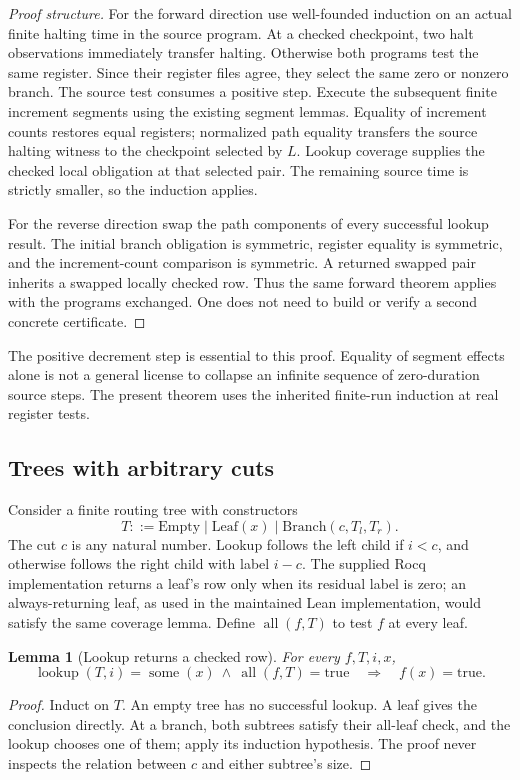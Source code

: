 \documentclass[11pt]{article}
\newtheorem{lemma}[theorem]{Lemma}
\theoremstyle{remark}\newtheorem{remark}[theorem]{Remark}
\newcommand{\get}{\operatorname{lookup}}
\newcommand{\all}{\operatorname{all}}
\newcommand{\some}{\operatorname{some}}
\begin{document}
\begin{proof}[Proof structure]
For the forward direction use well-founded induction on an actual finite halting time in the source program. At a checked checkpoint, two halt observations immediately transfer halting. Otherwise both programs test the same register. Since their register files agree, they select the same zero or nonzero branch. The source test consumes a positive step. Execute the subsequent finite increment segments using the existing segment lemmas. Equality of increment counts restores equal registers; normalized path equality transfers the source halting witness to the checkpoint selected by $L$. Lookup coverage supplies the checked local obligation at that selected pair. The remaining source time is strictly smaller, so the induction applies.

For the reverse direction swap the path components of every successful lookup result. The initial branch obligation is symmetric, register equality is symmetric, and the increment-count comparison is symmetric. A returned swapped pair inherits a swapped locally checked row. Thus the same forward theorem applies with the programs exchanged. One does not need to build or verify a second concrete certificate.
\end{proof}

The positive decrement step is essential to this proof. Equality of segment effects alone is not a general license to collapse an infinite sequence of zero-duration source steps. The present theorem uses the inherited finite-run induction at real register tests.

\subsection{Trees with arbitrary cuts}
Consider a finite routing tree with constructors
\[
 T ::= \mathrm{Empty}\mid\mathrm{Leaf}(x)\mid\mathrm{Branch}(c,T_l,T_r).
\]
The cut $c$ is any natural number. Lookup follows the left child if $i<c$, and otherwise follows the right child with label $i-c$. The supplied Rocq implementation returns a leaf's row only when its residual label is zero; an always-returning leaf, as used in the maintained Lean implementation, would satisfy the same coverage lemma. Define $\all(f,T)$ to test $f$ at every leaf.

\begin{lemma}[Lookup returns a checked row]
For every $f,T,i,x$,
\[
  \get(T,i)=\some(x)\ \wedge\ \all(f,T)=\mathrm{true}
  \quad\Longrightarrow\quad f(x)=\mathrm{true}.
\]
\end{lemma}
\begin{proof}
Induct on $T$. An empty tree has no successful lookup. A leaf gives the conclusion directly. At a branch, both subtrees satisfy their all-leaf check, and the lookup chooses one of them; apply its induction hypothesis. The proof never inspects the relation between $c$ and either subtree's size.
\end{proof}
\end{document}
